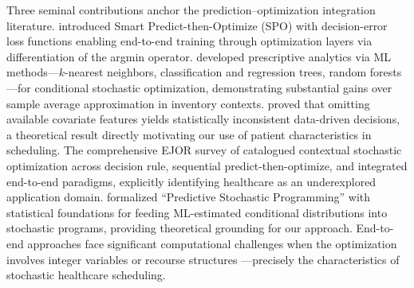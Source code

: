 \documentclass[11pt,a4paper]{article}
\begin{document}

Three seminal contributions anchor the prediction--optimization integration literature. \citet{elmachtoub2022smart} introduced Smart Predict-then-Optimize (SPO) with decision-error loss functions enabling end-to-end training through optimization layers via differentiation of the argmin operator. \citet{bertsimas2020predictive} developed prescriptive analytics via ML methods---$k$-nearest neighbors, classification and regression trees, random forests---for conditional stochastic optimization, demonstrating substantial gains over sample average approximation in inventory contexts. \citet{ban2019big} proved that omitting available covariate features yields statistically inconsistent data-driven decisions, a theoretical result directly motivating our use of patient characteristics in scheduling. The comprehensive EJOR survey of \citet{sadana2025contextual} catalogued contextual stochastic optimization across decision rule, sequential predict-then-optimize, and integrated end-to-end paradigms, explicitly identifying healthcare as an underexplored application domain. \citet{deng2022predictive} formalized ``Predictive Stochastic Programming'' with statistical foundations for feeding ML-estimated conditional distributions into stochastic programs, providing theoretical grounding for our approach. End-to-end approaches face significant computational challenges when the optimization involves integer variables or recourse structures \citep{mandi2024decision}---precisely the characteristics of stochastic healthcare scheduling.
\end{document}
